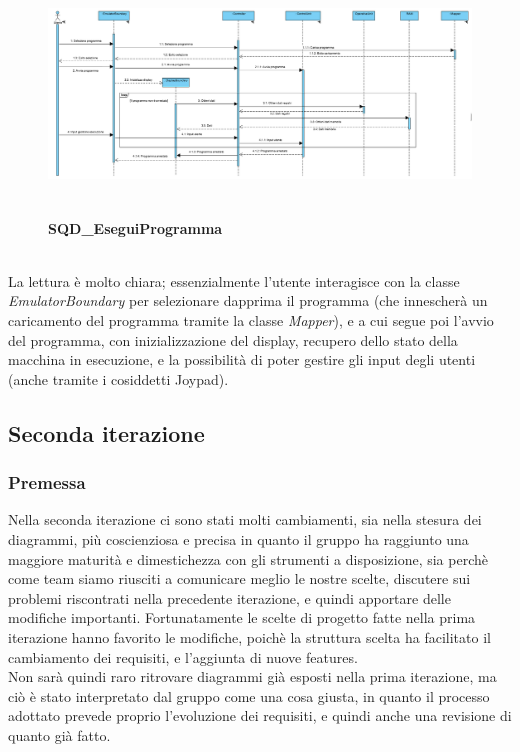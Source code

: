 \documentclass[11pt]{article}
\begin{document}
\begin{figure}[h]
\hspace*{-4.1cm}
\centering
\includegraphics[width=600px, height=241px]{SQD_EseguiProgramma.png}\\
\small\textbf{SQD\_EseguiProgramma}
\end{figure}\\
La lettura è molto chiara; essenzialmente l'utente interagisce con la classe \emph{EmulatorBoundary} per selezionare dapprima il programma (che innescherà un caricamento del programma tramite la classe \emph{Mapper}), e a cui segue poi l'avvio del programma, con inizializzazione del display, recupero dello stato della macchina in esecuzione, e la possibilità di poter gestire gli input degli utenti (anche tramite i cosiddetti Joypad).
\clearpage
\subsection{Seconda iterazione}
\subsubsection{Premessa}
Nella seconda iterazione ci sono stati molti cambiamenti, sia nella stesura dei diagrammi, più coscienziosa e precisa in quanto il gruppo ha raggiunto una maggiore maturità e dimestichezza con gli strumenti a disposizione, sia perchè come team siamo riusciti a comunicare meglio le nostre scelte, discutere sui problemi riscontrati nella precedente iterazione, e quindi apportare delle modifiche importanti. Fortunatamente le scelte di progetto fatte nella prima iterazione hanno favorito le modifiche, poichè la struttura scelta ha facilitato il cambiamento dei requisiti, e l'aggiunta di nuove features. \\
Non sarà quindi raro ritrovare diagrammi già esposti nella prima iterazione, ma ciò è stato interpretato dal gruppo come una cosa giusta, in quanto il processo adottato prevede proprio l'evoluzione dei requisiti, e quindi anche una revisione di quanto già fatto.
\end{document}
